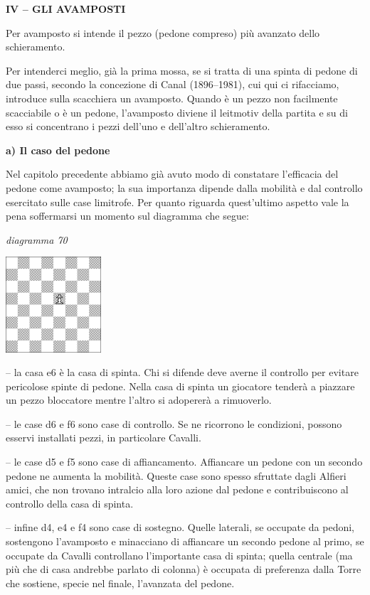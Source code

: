 \documentclass[
]{article}
\begin{document}
\textbf{IV -- GLI AVAMPOSTI}

Per avamposto si intende il pezzo (pedone compreso) più avanzato dello
schieramento.

Per intenderci meglio, già la prima mossa, se si tratta di una spinta di
pedone di due passi, secondo la concezione di Canal (1896--1981), cui
qui ci rifacciamo, introduce sulla scacchiera un avamposto. Quando è un
pezzo non facilmente scacciabile o è un pedone, l'avamposto diviene il
leitmotiv della partita e su di esso si concentrano i pezzi dell'uno e
dell'altro schieramento.

\textbf{a) Il caso del pedone}

Nel capitolo precedente abbiamo già avuto modo di constatare l'efficacia
del pedone come avamposto; la sua importanza dipende dalla mobilità e
dal controllo esercitato sulle case limitrofe. Per quanto riguarda
quest'ultimo aspetto vale la pena soffermarsi un momento sul diagramma
che segue:

\emph{diagramma 70}

\includegraphics[width=1.39792in,height=1.39792in]{vertopal_109f12be458a423d8f3cc838880eaea2/media/image70.png}

-- la casa e6 è la casa di spinta. Chi si difende deve averne il
controllo per evitare pericolose spinte di pedone. Nella casa di spinta
un giocatore tenderà a piazzare un pezzo bloccatore mentre l'altro si
adopererà a rimuoverlo.

-- le case d6 e f6 sono case di controllo. Se ne ricorrono le
condizioni, possono esservi installati pezzi, in particolare Cavalli.

-- le case d5 e f5 sono case di affiancamento. Affiancare un pedone con
un secondo pedone ne aumenta la mobilità. Queste case sono spesso
sfruttate dagli Alfieri amici, che non trovano intralcio alla loro
azione dal pedone e contribuiscono al controllo della casa di spinta.

-- infine d4, e4 e f4 sono case di sostegno. Quelle laterali, se
occupate da pedoni, sostengono l'avamposto e minacciano di affiancare un
secondo pedone al primo, se occupate da Cavalli controllano l'importante
casa di spinta; quella centrale (ma più che di casa andrebbe parlato di
colonna) è occupata di preferenza dalla Torre che sostiene, specie nel
finale, l'avanzata del pedone.
\end{document}
